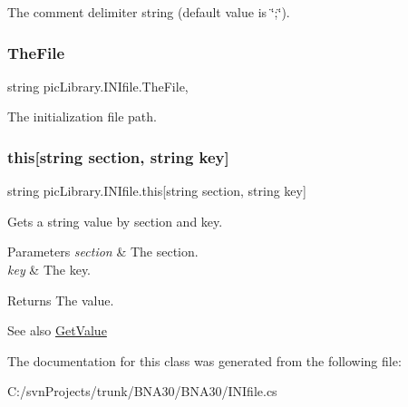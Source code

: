 The comment delimiter string (default value is \char`\"{};\char`\"{}). 

\mbox{\label{classpic_library_1_1_i_n_ifile_a2fbe7b6c7423b9740f6ec3747a2eecf1}} 
\subsubsection{\texorpdfstring{TheFile}{TheFile}}
{\footnotesize\ttfamily string pic\+Library.\+I\+N\+Ifile.\+The\+File\hspace{0.3cm}{\ttfamily [get]}, {\ttfamily [set]}}



The initialization file path. 

\mbox{\label{classpic_library_1_1_i_n_ifile_aec4861d4b2069527b6ac5da73e142a87}} 
\subsubsection{\texorpdfstring{this[string section, string key]}{this[string section, string key]}}
{\footnotesize\ttfamily string pic\+Library.\+I\+N\+Ifile.\+this\mbox{[}string section, string key\mbox{]}\hspace{0.3cm}{\ttfamily [get]}}



Gets a string value by section and key. 


\begin{DoxyParams}{Parameters}
{\em section} & The section.\\
\hline
{\em key} & The key.\\
\hline
\end{DoxyParams}
\begin{DoxyReturn}{Returns}
The value.
\end{DoxyReturn}
\begin{DoxySeeAlso}{See also}
\mbox{\hyperlink{classpic_library_1_1_i_n_ifile_a3af503f215c3c270458847c7f6733da5}{Get\+Value}}


\end{DoxySeeAlso}


The documentation for this class was generated from the following file\+:\begin{DoxyCompactItemize}
\item 
C\+:/svn\+Projects/trunk/\+B\+N\+A30/\+B\+N\+A30/I\+N\+Ifile.\+cs\end{DoxyCompactItemize}
